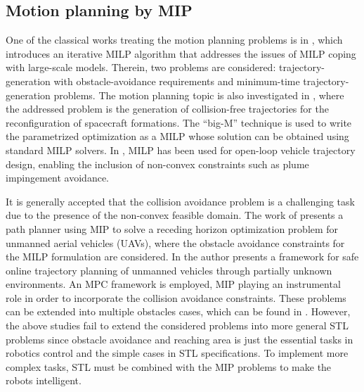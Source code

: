 \documentclass[a4paper]{report}
\begin{document}
\subsection{Motion planning by MIP}
One of the classical works treating the motion planning problems is in \cite[]{earl2005iterative}, which introduces an iterative MILP algorithm that addresses the issues of MILP coping with large-scale models. Therein, two problems are considered: trajectory-generation with obstacle-avoidance requirements and minimum-time trajectory-generation problems. The motion planning topic is also investigated in \cite{cetin2007hybrid}, where the addressed problem is the generation of collision-free trajectories for the reconfiguration of spacecraft formations. The “big-M” technique is used to write the parametrized optimization as a MILP whose solution can be obtained using standard MILP solvers. In \cite[]{richards2003performance}, MILP has been used for open-loop vehicle trajectory design, enabling the inclusion of non-convex constraints such as plume impingement avoidance.

It is generally accepted that the collision avoidance problem is a challenging task due to the presence of the non-convex feasible domain. The work of \cite[]{culligan2006online} presents a path planner using MIP to solve a receding horizon optimization problem for unmanned aerial vehicles (UAVs), where the obstacle avoidance constraints for the MILP formulation are considered. In \cite[]{schouwenaars2006safe} the author presents a framework for safe online trajectory planning of unmanned vehicles through partially unknown environments. An MPC framework is employed, MIP playing an instrumental role in order to incorporate the collision avoidance constraints. These problems can be extended into multiple obstacles cases, which can be found in \cite[]{maia2009use}\cite[]{stoican2018exact} \cite[]{richards2015inter}.
However, the above studies fail to extend the considered problems into more general STL problems since obstacle avoidance and reaching area is just the essential tasks in robotics control and the simple cases in STL specifications. To implement more complex tasks, STL must be combined with the MIP problems to make the robots intelligent.
\end{document}
